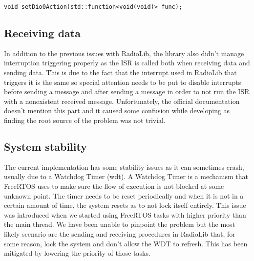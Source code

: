 \begin{lstlisting}[firstnumber=687, caption=Fragment of the PR that would have allowed RadioLib to accept member functions on ISR setup. The rest of the PR touches some internals of the library. This code section belongs to SX127x.cpp, label=lst:RadioLibPR,captionpos=b]
void setDio0Action(std::function<void(void)> func);
\end{lstlisting}

\subsection{Receiving data}
In addition to the previous issues with RadioLib, the library also didn't manage  interruption triggering properly as the ISR is called both when receiving data and sending data. This is due to the fact that the interrupt used in RadioLib that triggers it is the same so special attention needs to be put to disable interrupts before sending a message and after sending a message in order to not run the ISR with a nonexistent received message. Unfortunately, the official documentation doesn't mention this part and it caused some confusion while developing as finding the root source of the problem was not trivial.
\subsection{System stability}
The current implementation has some stability issues as it can sometimes crash, usually due to a Watchdog Timer (wdt).
A Watchdog Timer is a mechanism that FreeRTOS uses to make sure the flow of execution is not blocked at some unknown point. The timer needs to be reset periodically and when it is not in a certain amount of time, the system resets as to not lock itself entirely. This issue was introduced when we started using FreeRTOS tasks with higher priority than the main thread. We have been unable to pinpoint the problem but the most likely scenario are the sending and receiving procedures in RadioLib that, for some reason, lock the system and don't allow the WDT to refresh. This has been mitigated by lowering the priority of those tasks.